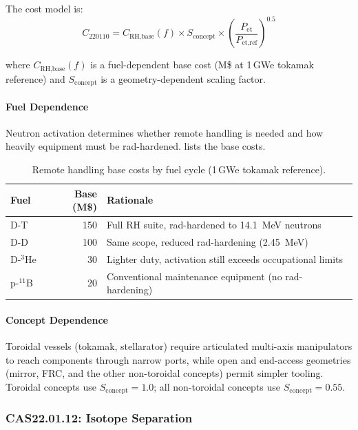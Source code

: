 \documentclass{article}
\begin{document}
The cost model is:
\begin{equation}
\label{eq:cas2210}
C_{220110} = C_{\text{RH,base}}(f) \times S_{\text{concept}}
             \times \left(\frac{P_{\text{et}}}{P_{\text{et,ref}}}\right)^{0.5}
\end{equation}

\noindent where $C_{\text{RH,base}}(f)$ is a fuel-dependent base cost
(M\$ at 1\,GWe tokamak reference) and $S_{\text{concept}}$ is a
geometry-dependent scaling factor.

\paragraph{Fuel Dependence}
Neutron activation determines whether remote handling is needed and how
heavily equipment must be rad-hardened.
 lists the base costs.

\begin{table}[htbp]
\caption{Remote handling base costs by fuel cycle (1\,GWe tokamak reference).}
\label{tab:rh-fuel}
\centering
\begin{tabular}{lrl}
\toprule
Fuel & Base (M\$) & Rationale \\
\midrule
D-T          & 150 & Full RH suite, rad-hardened to 14.1~MeV neutrons \\
D-D          & 100 & Same scope, reduced rad-hardening (2.45~MeV) \\
D-${}^3$He   &  30 & Lighter duty, activation still exceeds occupational limits \\
p-${}^{11}$B &  20 & Conventional maintenance equipment (no rad-hardening) \\
\bottomrule
\end{tabular}
\end{table}

\paragraph{Concept Dependence}
Toroidal vessels (tokamak, stellarator) require articulated multi-axis
manipulators to reach components through narrow ports, while open and
end-access geometries (mirror, FRC, and the other non-toroidal concepts)
permit simpler tooling. Toroidal concepts use $S_{\text{concept}} = 1.0$;
all non-toroidal concepts use $S_{\text{concept}} = 0.55$.


\subsubsection{CAS22.01.12: Isotope Separation}
\label{sec:cas2212}
\end{document}
